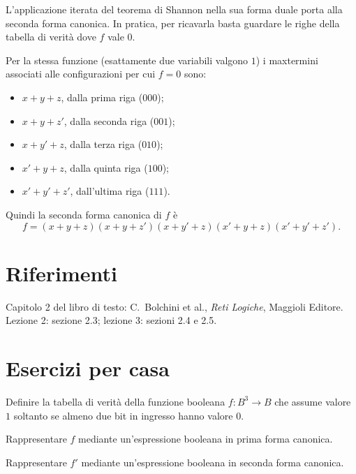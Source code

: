 \documentclass[11pt,a4paper]{article}
\begin{document}
L'applicazione iterata del teorema di Shannon nella sua forma duale porta alla
seconda forma canonica. In pratica, per ricavarla basta guardare le righe della
tabella di verità dove $f$ vale $0$.

\begin{esempio}
Per la stessa funzione (esattamente due variabili valgono $1$) i maxtermini
associati alle configurazioni per cui $f = 0$ sono:
\begin{itemize}
    \item $x + y + z$, dalla prima riga ($000$);
    \item $x + y + z'$, dalla seconda riga ($001$);
    \item $x + y' + z$, dalla terza riga ($010$);
    \item $x' + y + z$, dalla quinta riga ($100$);
    \item $x' + y' + z'$, dall'ultima riga ($111$).
\end{itemize}
Quindi la seconda forma canonica di $f$ è
\[
  f = (x + y + z)(x + y + z')(x + y' + z)(x' + y + z)(x' + y' + z') .
\]
\end{esempio}

\section*{Riferimenti}

Capitolo 2 del libro di testo: C.\ Bolchini et al., \emph{Reti Logiche},
Maggioli Editore. Lezione 2: sezione 2.3; lezione 3: sezioni 2.4 e 2.5.

\section*{Esercizi per casa}

\begin{esercizio}
Definire la tabella di verità della funzione booleana $f \colon B^3 \to B$ che
assume valore $1$ soltanto se almeno due bit in ingresso hanno valore $0$.
\end{esercizio}
\begin{esercizio}
Rappresentare $f$ mediante un'espressione booleana in prima forma canonica.
\end{esercizio}
\begin{esercizio}
Rappresentare $f'$ mediante un'espressione booleana in seconda forma canonica.
\end{esercizio}
\end{document}
